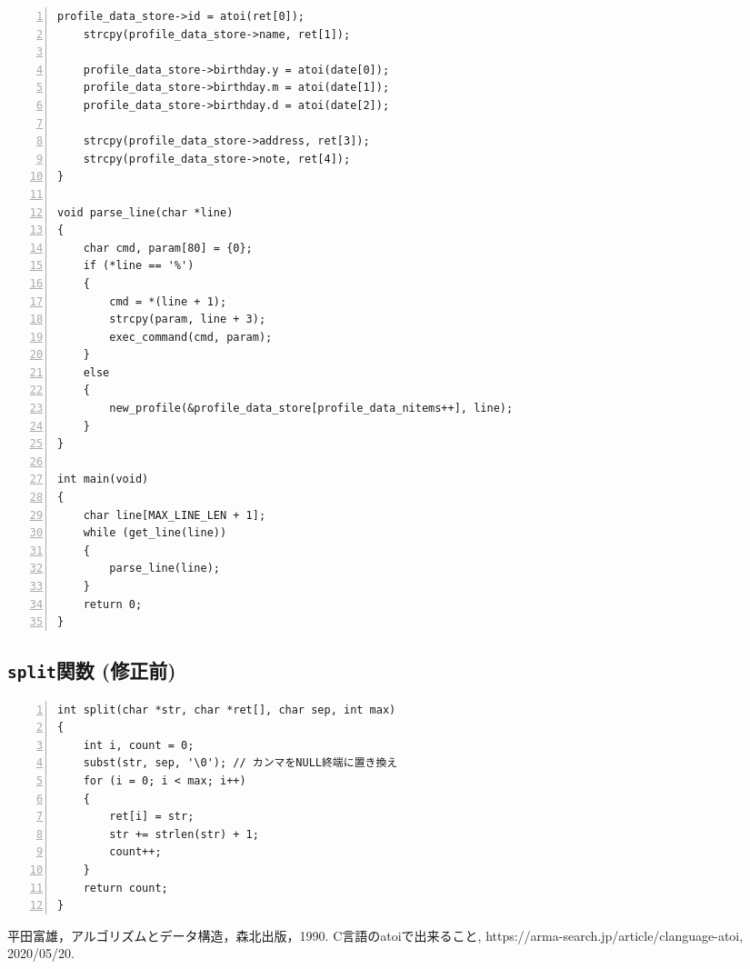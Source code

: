 \documentclass[autodetect-engine,dvi=dvipdfmx,ja=standard,
               a4j,11pt]{bxjsarticle}
\begin{document}
\begin{Verbatim}[numbers=left, xleftmargin=10mm, numbersep=6pt,
    fontsize=\small, baselinestretch=0.8]
    profile_data_store->id = atoi(ret[0]);
    strcpy(profile_data_store->name, ret[1]);

    profile_data_store->birthday.y = atoi(date[0]);
    profile_data_store->birthday.m = atoi(date[1]);
    profile_data_store->birthday.d = atoi(date[2]);

    strcpy(profile_data_store->address, ret[3]);
    strcpy(profile_data_store->note, ret[4]);
}

void parse_line(char *line)
{
    char cmd, param[80] = {0};
    if (*line == '%')
    {
        cmd = *(line + 1);
        strcpy(param, line + 3);
        exec_command(cmd, param);
    }
    else
    {
        new_profile(&profile_data_store[profile_data_nitems++], line);
    }
}

int main(void)
{
    char line[MAX_LINE_LEN + 1];
    while (get_line(line))
    {
        parse_line(line);
    }
    return 0;
}

\end{Verbatim}

\subsection{\texttt{split}関数 (修正前)} \label{code:7}

\begin{Verbatim}[numbers=left, xleftmargin=10mm, numbersep=6pt,
    fontsize=\small, baselinestretch=0.8]
int split(char *str, char *ret[], char sep, int max)
{
    int i, count = 0;
    subst(str, sep, '\0'); // カンマをNULL終端に置き換え
    for (i = 0; i < max; i++)
    {
        ret[i] = str;
        str += strlen(str) + 1;
        count++;
    }
    return count;
}

\end{Verbatim}


\begin{thebibliography}{99}
   平田富雄，アルゴリズムとデータ構造，森北出版，1990.
   C言語のatoiで出来ること, https://arma-search.jp/article/clanguage-atoi, 2020/05/20.
\end{thebibliography}

\end{document}
